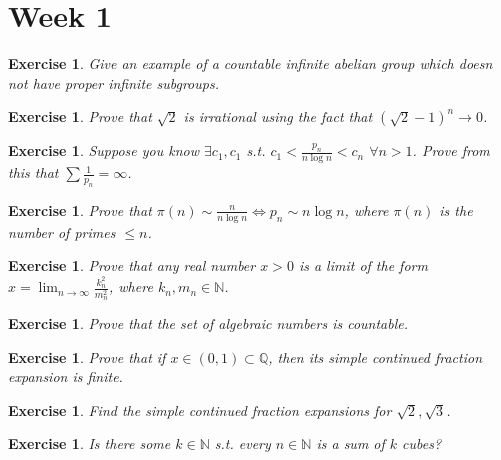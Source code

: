 \documentclass[10pt]{article}
\theoremstyle{plain}
\newtheorem{e}[Thm]{Exercise}
\begin{document}
\maketitle

\section*{Week 1}

\begin{e}
Give an example of a countable infinite abelian group which doesn not have proper infinite subgroups. 
\end{e}

\begin{e}
Prove that $\sqrt{2}$ is irrational using the fact that $(\sqrt{2} - 1)^n \rightarrow 0$.
\end{e} 

\begin{e}
Suppose you know $\exists c_1,c_1$ s.t. $c_1 < \frac{p_n}{n\log n} < c_n$ $\forall n > 1$. Prove from this that $\sum \frac{1}{p_n} = \infty$. 
\end{e}

\begin{e}
Prove that $\pi(n) \sim \frac{n}{n \log n} \Leftrightarrow p_n \sim n \log n$, where $\pi(n)$ is the number of primes $\leq n$. 
\end{e}

\begin{e}
Prove that any real number $x > 0$ is a limit of the form $x = \lim_{n \to \infty} \frac{k_n^2}{m_n^2}$, where $k_n,m_n \in \mathbb{N}$. 
\end{e}

\begin{e}
Prove that the set of algebraic numbers is countable. 
\end{e}

\begin{e}
Prove that if $x \in (0,1) \subset \mathbb{Q}$, then its simple continued fraction expansion is finite. 
\end{e}

\begin{e}
Find the simple continued fraction expansions for $\sqrt{2}, \sqrt{3}$. 
\end{e}

\begin{e}
Is there some $k \in \mathbb{N}$ s.t. every $n \in \mathbb{N}$ is a sum of $k$ cubes?
\end{e}
\end{document}
